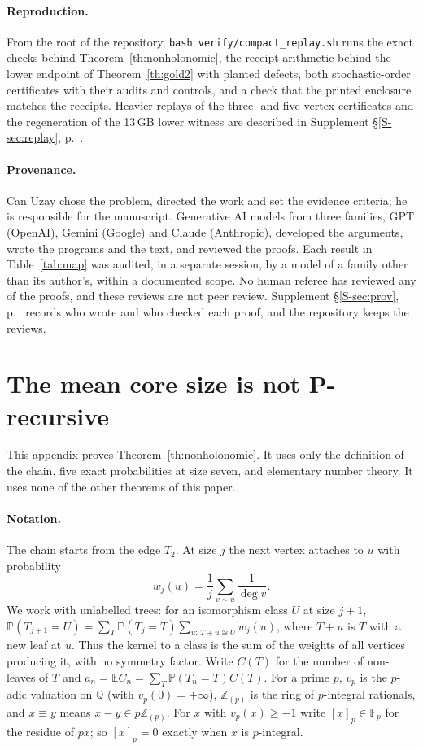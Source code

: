 \documentclass[11pt]{article}
\theoremstyle{remark}
\newcommand{\E}{\mathbb E}
\newcommand{\Prob}{\mathbb P}
\newcommand{\res}[1]{[#1]_p}
\newcommand{\Sref}[1]{Supplement \S\ref{S-#1}, p.~\pageref{S-#1}}
\begin{document}
\paragraph{Reproduction.} From the root of the repository, \texttt{bash verify/compact\_replay.sh} runs the exact checks behind Theorem~\ref{th:nonholonomic}, the receipt arithmetic behind the lower endpoint of Theorem~\ref{th:gold2} with planted defects, both stochastic-order certificates with their audits and controls, and a check that the printed enclosure matches the receipts. Heavier replays of the three- and five-vertex certificates and the regeneration of the 13\,GB lower witness are described in \Sref{sec:replay}.

\paragraph{Provenance.} Can Uzay chose the problem, directed the work and set the evidence criteria; he is responsible for the manuscript. Generative AI models from three families, GPT (OpenAI), Gemini (Google) and Claude (Anthropic), developed the arguments, wrote the programs and the text, and reviewed the proofs. Each result in Table~\ref{tab:map} was audited, in a separate session, by a model of a family other than its author's, within a documented scope. No human referee has reviewed any of the proofs, and these reviews are not peer review. \Sref{sec:prov} records who wrote and who checked each proof, and the repository keeps the reviews.

\clearpage
\appendix
\renewcommand{\thesection}{PREC}
\renewcommand{\theHsection}{PREC}
\renewcommand{\thesubsection}{\thesection.\alph{subsection}}
\section{The mean core size is not P-recursive}\label{app:nonholonomic}
This appendix proves Theorem~\ref{th:nonholonomic}. It uses only the definition of the chain, five exact probabilities at size seven, and elementary number theory. It uses none of the other theorems of this paper.

\paragraph{Notation.} The chain starts from the edge $T_2$. At size $j$ the next vertex attaches to $u$ with probability
\[
 w_j(u)=\frac1j\sum_{v\sim u}\frac1{\deg v}.
\]
We work with unlabelled trees: for an isomorphism class $U$ at size $j+1$, $\Prob(T_{j+1}=U)=\sum_T\Prob(T_j=T)\sum_{u:\,T+u\cong U}w_j(u)$, where $T+u$ is $T$ with a new leaf at $u$. Thus the kernel to a class is the sum of the weights of all vertices producing it, with no symmetry factor. Write $C(T)$ for the number of non-leaves of $T$ and $a_n=\E C_n=\sum_T\Prob(T_n=T)C(T)$. For a prime $p$, $v_p$ is the $p$-adic valuation on $\mathbb Q$ (with $v_p(0)=+\infty$), $\mathbb Z_{(p)}$ is the ring of $p$-integral rationals, and $x\equiv y$ means $x-y\in p\mathbb Z_{(p)}$. For $x$ with $v_p(x)\ge-1$ write $\res{x}\in\mathbb F_p$ for the residue of $px$; so $\res{x}=0$ exactly when $x$ is $p$-integral.
\end{document}
